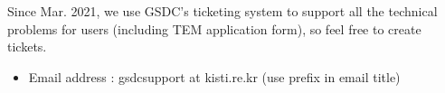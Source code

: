 \documentclass[a4paper,11pt,english]{sphinxmanual}
\begin{document}
\sphinxAtStartPar
Since Mar. 2021, we use GSDC’s ticketing system to support all the technical problems for users (including TEM application form), so feel free to create tickets.
\begin{itemize}
\item {} 
\sphinxAtStartPar
E\sphinxhyphen{}mail address : gsdc\sphinxhyphen{}support at kisti.re.kr (use \sphinxstylestrong{{[}TEM{]}} prefix in e\sphinxhyphen{}mail title)

\end{itemize}



\renewcommand{\indexname}{Index}
\printindex
\end{document}
